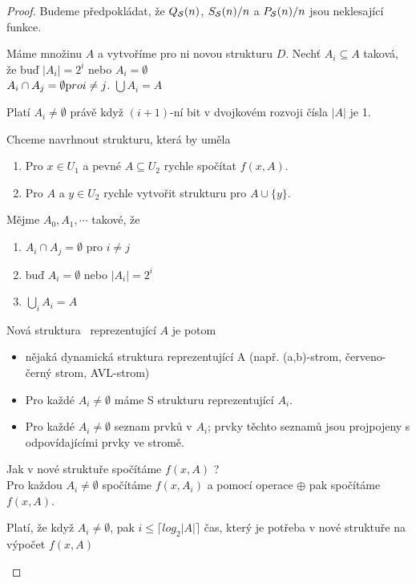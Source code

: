 \begin{proof}
Budeme předpokládat, že $Q_{\mathcal{S}}(n)$, $S_{\mathcal{S}}(n)/n$ a
$P_{\mathcal{S}}(n)/n$ jsou neklesající funkce.

Máme množinu $A$ a vytvoříme pro ni novou strukturu $D$.
Nechť $A_i \subseteq A$ taková, že buď $|A_i| = 2^i$ nebo $A_i = \emptyset$ \\
$A_i \cap A_j = \emptyset {\text pro } i \neq j$.
$\bigcup A_i = A$

Platí $A_i \neq \emptyset$ právě když $(i+1)$-ní bit v dvojkovém rozvoji čísla
$|A|$ je 1.

Chceme navrhnout strukturu, která by uměla
\begin{enumerate}
\item Pro $x \in U_1$ a pevné $A \subseteq U_2$ rychle spočítat $f(x, A)$.
\item Pro $A$ a $y \in U_2$ rychle vytvořit strukturu pro $A \cup \{y\}$.
\end{enumerate}

Mějme $A_0, A_1, \cdots$ takové, že
\begin{enumerate}
\item $A_i \cap A_j = \emptyset$ pro $i \neq j$
\item buď $A_i = \emptyset$ nebo $|A_i| = 2^i$ 
\item $\bigcup_i A_i = A$ 
\end{enumerate}

Nová struktura \dynamicka\ reprezentující $A$ je potom
\begin{itemize}
\item nějaká dynamická struktura reprezentující A
(např. (a,b)-strom, červeno-černý strom, AVL-strom)
\item Pro každé $A_i \neq \emptyset$ máme S strukturu reprezentující $A_i$.
\item Pro každé $A_i \neq \emptyset$ seznam prvků v $A_i$; prvky
těchto seznamů jsou projpojeny s odpovídajícími prvky ve stromě.
\end{itemize}

Jak v nové struktuře spočítáme $f(x,A)$ ? \\
Pro každou $A_i \neq \emptyset$ spočítáme $f(x,A_i)$ a pomocí operace
$\oplus$ pak spočítáme $f(x,A)$.

\begin{pozn}
Platí, že když $A_i \neq \emptyset$, pak 
$i \leq \lceil log_2|A| \rceil$
čas, který je potřeba v nové struktuře na výpočet $f(x,A)$
\end{pozn}


\end{proof}
